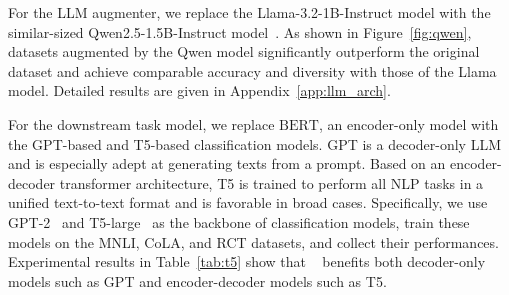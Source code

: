 For the LLM augmenter, we replace the Llama-3.2-1B-Instruct model with the similar-sized Qwen2.5-1.5B-Instruct model~\cite{qwen2.5}. As shown in Figure~\ref{fig:qwen}, datasets augmented by the Qwen model significantly outperform the original dataset and achieve comparable accuracy and diversity with those of the Llama model. Detailed results are given in Appendix~\ref{app:llm_arch}.

For the downstream task model, we replace \(\text{BERT}\), an encoder-only model with the GPT-based and T5-based classification models. 
GPT is a decoder-only LLM and is especially adept at generating texts from a prompt. Based on an encoder-decoder transformer architecture, T5 is trained to perform all NLP tasks in a unified text-to-text format and is favorable in broad cases. Specifically, we use GPT-2~\cite{radford2019language} and T5-large~\cite{raffel2020exploring} as the backbone of classification models, train these models on the MNLI, CoLA, and RCT datasets, and collect their performances. 
Experimental results in Table~\ref{tab:t5} show that \Methodnamec~ benefits both decoder-only models such as GPT and encoder-decoder models such as T5. 
